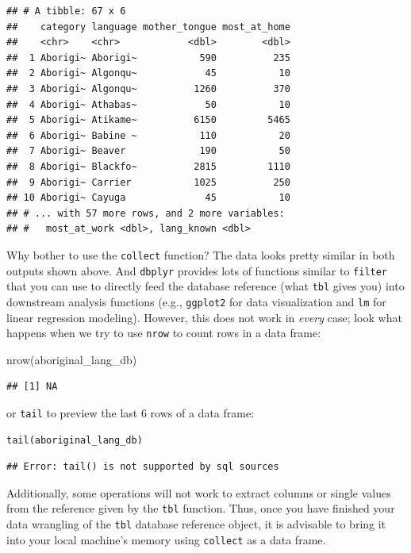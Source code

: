 \documentclass[
]{krantz}
\makeatletter
\newenvironment{Shaded}{\begin{snugshade}}{\end{snugshade}}
\newcommand{\FunctionTok}[1]{\textcolor[rgb]{0,0,0}{#1}}
\newcommand{\NormalTok}[1]{#1}
\newenvironment{kframe}{%
\medskip{}
\setlength{\fboxsep}{.8em}
 \def\at@end@of@kframe{}%
 \ifinner\ifhmode%
  \def\at@end@of@kframe{\end{minipage}}%
  \begin{minipage}{\columnwidth}%
 \fi\fi%
 \def\FrameCommand##1{\hskip\@totalleftmargin \hskip-\fboxsep
 \colorbox{shadecolor}{##1}\hskip-\fboxsep
     \hskip-\linewidth \hskip-\@totalleftmargin \hskip\columnwidth}%
 \MakeFramed {\advance\hsize-\width
   \@totalleftmargin\z@ \linewidth\hsize
   \@setminipage}}%
 {\par\unskip\endMakeFramed%
 \at@end@of@kframe}
\renewenvironment{Shaded}{\begin{kframe}}{\end{kframe}}
\makeatother
\begin{document}
\begin{verbatim}
## # A tibble: 67 x 6
##    category language mother_tongue most_at_home
##    <chr>    <chr>            <dbl>        <dbl>
##  1 Aborigi~ Aborigi~           590          235
##  2 Aborigi~ Algonqu~            45           10
##  3 Aborigi~ Algonqu~          1260          370
##  4 Aborigi~ Athabas~            50           10
##  5 Aborigi~ Atikame~          6150         5465
##  6 Aborigi~ Babine ~           110           20
##  7 Aborigi~ Beaver             190           50
##  8 Aborigi~ Blackfo~          2815         1110
##  9 Aborigi~ Carrier           1025          250
## 10 Aborigi~ Cayuga              45           10
## # ... with 57 more rows, and 2 more variables:
## #   most_at_work <dbl>, lang_known <dbl>
\end{verbatim}

Why bother to use the \texttt{collect} function? The data looks pretty similar in both outputs shown above. And \texttt{dbplyr} provides lots of functions similar to \texttt{filter} that
you can use to directly feed the database reference (what \texttt{tbl} gives you) into downstream analysis functions (e.g., \texttt{ggplot2} for data visualization and \texttt{lm} for
linear regression modeling). However, this does not
work in \emph{every} case; look what happens when we try to use \texttt{nrow} to count rows in a data frame:

\begin{Shaded}
\begin{Highlighting}[]
\FunctionTok{nrow}\NormalTok{(aboriginal\_lang\_db)}
\end{Highlighting}
\end{Shaded}

\begin{verbatim}
## [1] NA
\end{verbatim}

or \texttt{tail} to preview the last 6 rows of a data frame:

\begin{verbatim}
tail(aboriginal_lang_db)
\end{verbatim}

\begin{verbatim}
## Error: tail() is not supported by sql sources
\end{verbatim}

Additionally, some operations will not work to extract columns or single values from the reference given by the \texttt{tbl} function. Thus, once you have finished your data wrangling of the \texttt{tbl} database reference object, it is advisable to bring it into your local machine's memory using \texttt{collect} as a data frame.
\end{document}
